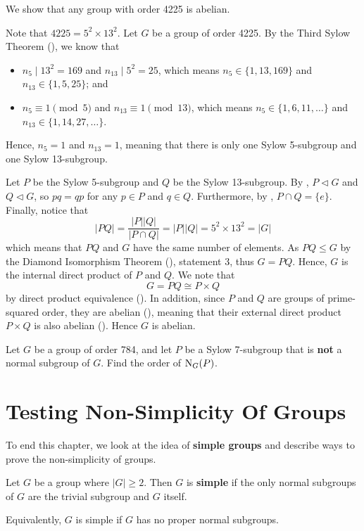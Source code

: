 \begin{example}
    We show that any group with order 4225 is abelian.

    Note that $4225 = 5^2 \times 13^2$. Let $G$ be a group of order 4225. By the Third Sylow Theorem (), we know that
    \begin{itemize}
        \item $n_5 \mid 13^2 = 169$ and $n_{13} \mid 5^2 = 25$, which means $n_5 \in \{1, 13, 169\}$ and $n_{13} \in \{1, 5, 25\}$; and
        \item $n_5 \equiv 1 \pmod 5$ and $n_{13} \equiv 1 \pmod{13}$, which means $n_5 \in \{1, 6, 11, \dots\}$ and $n_{13} \in \{1, 14, 27, \dots\}$.
    \end{itemize}
    Hence, $n_5 = 1$ and $n_{13} = 1$, meaning that there is only one Sylow 5-subgroup and one Sylow 13-subgroup.

    Let $P$ be the Sylow 5-subgroup and $Q$ be the Sylow 13-subgroup. By , $P \lhd G$ and $Q \lhd G$, so $pq = qp$ for any $p \in P$ and $q \in Q$. Furthermore, by , $P \cap Q = \{e\}$. Finally, notice that
    \[
        |PQ| = \frac{|P||Q|}{|P\cap Q|} = |P||Q| = 5^2\times13^2 = |G|
    \]
    which means that $PQ$ and $G$ have the same number of elements. As $PQ \leq G$ by the Diamond Isomorphism Theorem (), statement 3, thus $G = PQ$. Hence, $G$ is the internal direct product of $P$ and $Q$. We note that
    \[
        G = PQ \cong P\times Q
    \]
    by direct product equivalence (). In addition, since $P$ and $Q$ are groups of prime-squared order, they are abelian (), meaning that their external direct product $P\times Q$ is also abelian (). Hence $G$ is abelian.
\end{example}

\begin{exercise}
    Let $G$ be a group of order 784, and let $P$ be a Sylow 7-subgroup that is \textbf{not} a normal subgroup of $G$. Find the order of $\mathrm{N}_{G}(P)$.
\end{exercise}

\section{Testing Non-Simplicity Of Groups}
To end this chapter, we look at the idea of \textbf{simple groups} and describe ways to prove the non-simplicity of groups.
\begin{definition}
    Let $G$ be a group where $|G| \geq 2$. Then $G$ is \textbf{simple} if the only normal subgroups of $G$ are the trivial subgroup and $G$ itself.
\end{definition}
\begin{remark}
    Equivalently, $G$ is simple if $G$ has no proper normal subgroups.
\end{remark}

